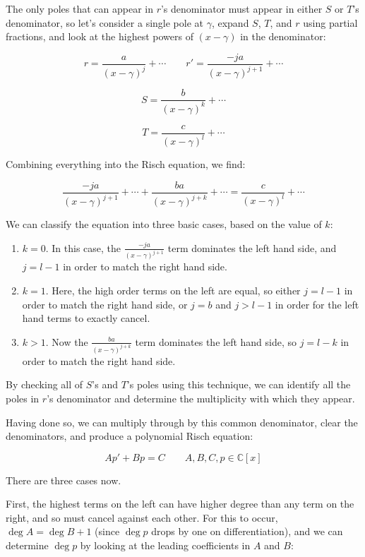 The only poles that can appear in $r$'s denominator must appear in
either $S$ or $T$'s denominator, so let's consider a single pole at
$\gamma$, expand $S$, $T$, and $r$ using partial fractions, and look
at the highest powers of $(x-\gamma)$ in the denominator:

$$r = \frac{a}{(x-\gamma)^j} + \cdots  \qquad  r' = \frac{-ja}{(x-\gamma)^{j+1}} + \cdots$$

$$S = \frac{b}{(x-\gamma)^k} + \cdots$$

$$T = \frac{c}{(x-\gamma)^l} + \cdots$$

Combining everything into the Risch equation, we find:

$$\frac{-ja}{(x-\gamma)^{j+1}} + \cdots + \frac{ba}{(x-\gamma)^{j+k}} + \cdots = \frac{c}{(x-\gamma)^l} + \cdots$$

We can classify the equation into three basic cases, based on the value of $k$:

\begin{enumerate}

\item $k=0$.  In this case, the $\frac{-ja}{(x-\gamma)^{j+1}}$ term dominates the left hand side,
and $j = l-1$ in order to match the right hand side.

\item $k=1$.  Here, the high order terms on the left are equal, so either $j=l-1$ in order to match
the right hand side, or $j=b$ and $j>l-1$ in order for the left hand terms to exactly cancel.

\item $k>1$.  Now the $\frac{ba}{(x-\gamma)^{j+k}}$ term dominates the left hand side, so $j=l-k$ in
order to match the right hand side.

\end{enumerate}

By checking all of $S$'s and $T$'s poles using this technique, we can
identify all the poles in $r$'s denominator and determine the
multiplicity with which they appear.

Having done so, we can multiply through by this common denominator,
clear the denominators, and produce a polynomial Risch equation:

$$A p' + B p = C \qquad A,B,C,p \in {\mathbb C}[x]$$

There are three cases now.

First, the highest terms on the left can have higher degree than any term on
the right, and so must cancel against each other.  For this to occur,
$\deg A = \deg B + 1$ (since $\deg p$ drops by one on differentiation),
and we can determine $\deg p$ by looking at the leading
coefficients in $A$ and $B$:

